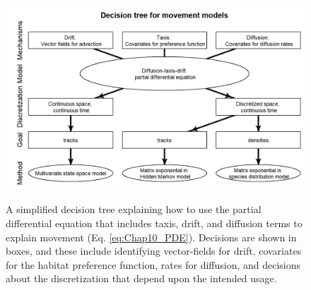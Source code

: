 \begin{figure}[!ht]
    \caption[Decision tree for using taxis-diffusion-drift movement model]{A simplified decision tree explaining how to use the partial differential equation that includes taxis, drift, and diffusion terms to explain movement (Eq. \ref{eq:Chap10_PDE}).  Decisions are shown in boxes, and these include identifying vector-fields for drift, covariates for the habitat preference function, rates for diffusion, and decisions about the discretization that depend upon the intended usage.}
    \includegraphics[width=5.5in]{Chap_10/Decision_tree_for_movement.png}
    \label{fig:Chap10_decision_tree}
\end{figure}

